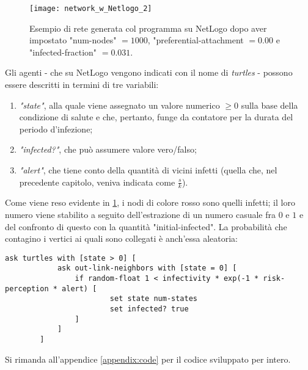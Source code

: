 \begin{figure}[t]
		\begin{center}
			\texttt{[image: network\_w\_Netlogo\_2]}
			\caption{Esempio di rete generata col programma su NetLogo dopo aver impostato "num-nodes" $= 1000 $, "preferential-attachment $= 0.00 $ e "infected-fraction" $= 0.031 $.}
			\label{fig:NetLogo1}
		\end{center}
\end{figure}
Gli agenti - che su NetLogo vengono indicati con il nome di \emph{turtles} - possono essere descritti in termini di tre variabili:
\begin{enumerate}
\item \textit{"state"}, alla quale viene assegnato un valore numerico $ \geq 0 $ sulla base della condizione di salute e che, pertanto, funge da contatore per la durata del periodo d'infezione;
\item \textit{"infected?"}, che può assumere valore vero/falso;
\item \textit{"alert"}, che tiene conto della quantità di vicini infetti (quella che, nel precedente capitolo, veniva indicata come $ \tfrac{s}{k}$).
\end{enumerate}
Come viene reso evidente in \cref{fig:NetLogo1}, i nodi di colore rosso sono quelli infetti; il loro numero viene stabilito a seguito dell'estrazione di un numero casuale fra $ 0 $ e $ 1 $ e del confronto di questo con la quantità "initial-infected". La probabilità che contagino i vertici ai quali sono collegati è anch'essa aleatoria:
\begin{center}
\begin{lstlisting}[language={NetLogo},caption={Porzione di codice in cui si mette in luce il meccanismo di infezione.},label={list:infection_prob}]
		ask turtles with [state > 0] [
    		ask out-link-neighbors with [state = 0] [
      			if random-float 1 < infectivity * exp(-1 * risk-perception * alert) [
        				set state num-states
        				set infected? true
      			]
    		]
  		] 
  		\end{lstlisting}
\end{center}
Si rimanda all'appendice \ref{appendix:code} per il codice sviluppato per intero.
